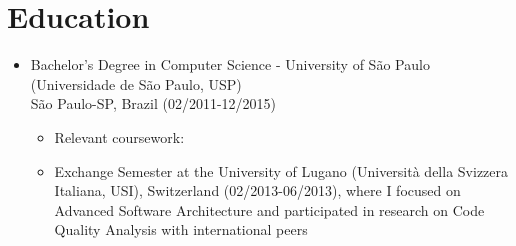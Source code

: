 
\section{Education}
\begin{itemize}
    \item \small{Bachelor's Degree in Computer Science - University of São Paulo (Universidade de São Paulo, USP)}\\
    \footnotesize{São Paulo-SP, Brazil (02/2011-12/2015)}
    \begin{itemize}[itemsep=1pt, parsep=0pt]
        \item \footnotesize{Relevant coursework: \RelevantCoursework}
        \item \footnotesize{Exchange Semester at the University of Lugano (Università della Svizzera Italiana, USI), Switzerland
            (02/2013-06/2013), where I focused on Advanced Software Architecture and participated in 
            research on Code Quality Analysis with international peers}
    \end{itemize}
\end{itemize}